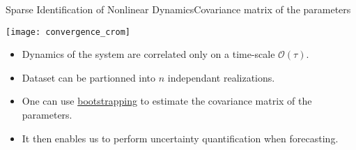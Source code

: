 



\begin{frame}[t, c]{Sparse Identification of Nonlinear Dynamics}{Covariance matrix of the parameters}
  \begin{minipage}{.48\textwidth}
    \centering
    \texttt{[image: convergence\_crom]}
  \end{minipage}%
  \hfill
  \begin{minipage}{.48\textwidth}
    \begin{itemize}
    \item Dynamics of the system are correlated only on a time-scale $\mathcal{O}(\tau)$.
    \item Dataset can be partionned into $n$ independant realizations.
    \end{itemize}
  \end{minipage}

  \bigskip
  
  \begin{minipage}{.48\textwidth}
    \begin{itemize}
    \item One can use \underline{bootstrapping} to estimate the covariance matrix of the parameters.
    \item It then enables us to perform uncertainty quantification when forecasting.
    \end{itemize}
  \end{minipage}%
  \hfill
  \begin{minipage}{.48\textwidth}
  \end{minipage}

  \vspace{1cm}
\end{frame}